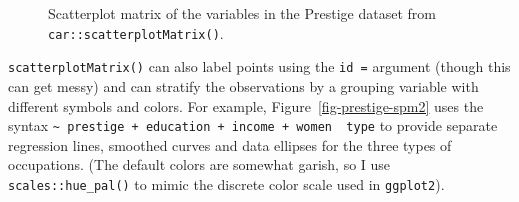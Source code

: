 \documentclass[
  letterpaper,
  10pt,
  krantz2]{krantz}
\begin{document}
{\begin{figure}[H]


\caption{\label{fig-prestige-spm1}Scatterplot matrix of the variables in
the Prestige dataset from \texttt{car::scatterplotMatrix()}.}

\end{figure}%

\texttt{scatterplotMatrix()} can also label points using the
\texttt{id\ =} argument (though this can get messy) and can stratify the
observations by a grouping variable with different symbols and colors.
For example, Figure~\ref{fig-prestige-spm2} uses the syntax
\texttt{\textasciitilde{}\ prestige\ +\ education\ +\ income\ +\ women\ \textbar{}\ type}
to provide separate regression lines, smoothed curves and data ellipses
for the three types of occupations. (The default colors are somewhat
garish, so I use \texttt{scales::hue\_pal()} to mimic the discrete color
scale used in \texttt{ggplot2}).

}
\end{document}
